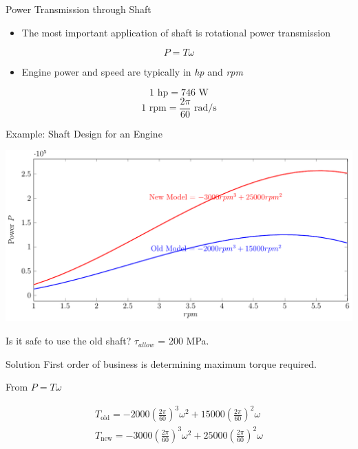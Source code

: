\documentclass[10pt, svgnames]{beamer}
\begin{document}
\begin{frame}[label={sec:org7d89acd}]{Power Transmission through Shaft}
\begin{itemize}
\item The most important application of shaft is rotational power
transmission
\end{itemize}

\[P = T\omega\]

\begin{itemize}
\item Engine power and speed are typically in \emph{hp} and \emph{rpm}
\end{itemize}

\[1 \text{ hp} = 746 \text{ W}\]
\[1 \text{ rpm} = \frac{2\pi}{60} \text{ rad/s}\]
\end{frame}

\begin{frame}[label={sec:orgd4d21be}]{Example: Shaft Design for an Engine}
\begin{center}
\includegraphics[width=\textwidth]{pictures/shaft-design-example.pdf}
\end{center}

Is it safe to use the old shaft? \(\tau_{allow}\) = 200 MPa.
\end{frame}

\begin{frame}[label={sec:org4ead554}]{Solution}
First order of business is determining maximum torque required.

From \(P = T\omega\)

\begin{align*}
    T_{\text{old}} = -2000 (\frac{2\pi}{60})^{3} \omega^{2} + 15000 (\frac{2\pi}{60})^{2} \omega \\
    T_{\text{new}} = -3000 (\frac{2\pi}{60})^{3} \omega^{2} + 25000 (\frac{2\pi}{60})^{2} \omega
\end{align*}
\end{frame}
\end{document}

